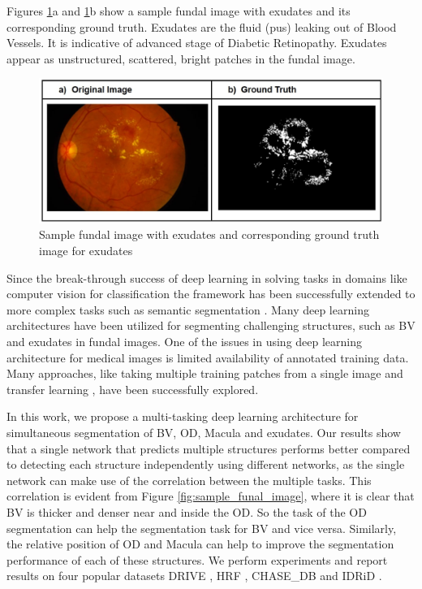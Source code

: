 \documentclass[utf8]{FrontiersinHarvard} %
\begin{document}
Figures \ref{fig:exudates_with_gt}a and \ref{fig:exudates_with_gt}b show a sample  fundal image with exudates and its corresponding ground truth. Exudates are the fluid (pus) leaking out of Blood Vessels. It is indicative of advanced stage of Diabetic Retinopathy. Exudates appear as unstructured, scattered, bright patches in the fundal image.

\begin{figure}
\centering
\includegraphics[width=0.8\linewidth]{images/exudates_with_gt.jpg}
\caption{Sample fundal image with exudates and corresponding ground truth image for exudates}
\label{fig:exudates_with_gt}
\end{figure}

Since the break-through success of deep learning in solving tasks in domains like computer vision for classification \cite{krizhevsky2012imagenet} \cite{simonyan2014very} the framework has been successfully extended to more complex tasks such as semantic segmentation \cite{chen2017deeplab,Yu_2018_ECCV,wang2018under} . Many deep learning architectures have been utilized for segmenting challenging structures, such as BV \cite {vengalil2016customizing} \cite{zhuang2018laddernet} \cite{jiang2018retinal} \cite{park2020m} and exudates \cite{kou2020enhanced,guo2020bin,nur2018exudate} in fundal images. One of the issues in using deep learning architecture for medical images is limited availability  of annotated training data. Many approaches, like taking multiple training patches from  a single image \cite{vengalil2016customizing} and transfer learning \cite{vengalil2016customizing}, have been successfully explored.

In this work, we propose a multi-tasking deep learning architecture for simultaneous segmentation of BV, OD, Macula and exudates. Our results show that a single network that predicts multiple structures  performs better compared to detecting  each structure independently using different networks, as the single network can make use of the correlation between the multiple tasks. This correlation is evident from Figure \ref{fig:sample_funal_image}, where it is clear that BV is thicker and denser near and inside the OD. So the task of the OD segmentation can help the segmentation task for BV and vice versa.  Similarly, the relative position of OD and Macula can help to improve the segmentation performance of each of these structures. We perform experiments and report results on four popular datasets DRIVE , HRF \cite{budai2013robust}, CHASE\_DB and IDRiD \cite{h25w98-18}.
\end{document}
